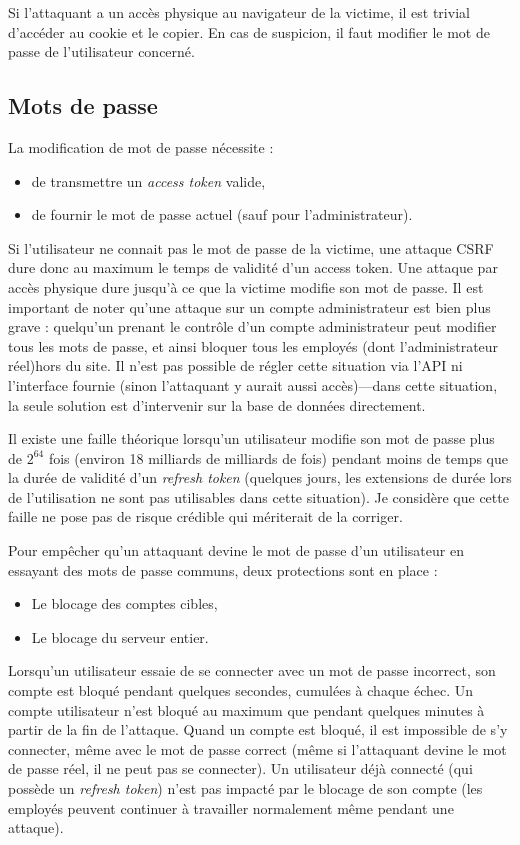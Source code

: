 \documentclass[11pt,french]{memoir}
\begin{document}
	Si l’attaquant a un accès physique au navigateur de la victime, il est trivial d’accéder au cookie et le copier.
	En cas de suspicion, il faut modifier le mot de passe de l’utilisateur concerné.

	\subsection{Mots de passe}\label{subsec:mots-de-passe}

	La modification de mot de passe nécessite :
	\begin{itemize}
		\item de transmettre un \emph{access token} valide,
		\item de fournir le mot de passe actuel (sauf pour l'administrateur).
	\end{itemize}

	Si l’utilisateur ne connait pas le mot de passe de la victime, une attaque CSRF dure donc au maximum le temps de validité d’un access token.
	Une attaque par accès physique dure jusqu’à ce que la victime modifie son mot de passe.
	Il est important de noter qu’une attaque sur un compte administrateur est bien plus grave :
	quelqu’un prenant le contrôle d’un compte administrateur peut modifier tous les mots de passe, et ainsi bloquer tous les employés (dont l’administrateur réel)hors du site.
	Il n’est pas possible de régler cette situation via l’API ni l’interface fournie (sinon l’attaquant y aurait aussi accès)---dans cette situation, la seule solution est d'intervenir sur la base de données directement.

	Il existe une faille théorique lorsqu’un utilisateur modifie son mot de passe plus de $2^{64}$ fois (environ 18 milliards de milliards de fois) pendant moins de temps que la durée de validité d’un \emph{refresh token} (quelques jours, les extensions de durée lors de l’utilisation ne sont pas utilisables dans cette situation).
	Je considère que cette faille ne pose pas de risque crédible qui mériterait de la corriger.

	\uparagraph
	Pour empêcher qu’un attaquant devine le mot de passe d’un utilisateur en essayant des mots de passe communs, deux protections sont en place :
	\begin{itemize}
		\item Le blocage des comptes cibles,
		\item Le blocage du serveur entier.
	\end{itemize}

	Lorsqu’un utilisateur essaie de se connecter avec un mot de passe incorrect, son compte est bloqué pendant quelques secondes, cumulées à chaque échec.
	Un compte utilisateur n’est bloqué au maximum que pendant quelques minutes à partir de la fin de l’attaque.
	Quand un compte est bloqué, il est impossible de s’y connecter, même avec le mot de passe correct (même si l’attaquant devine le mot de passe réel, il ne peut pas se connecter).
	Un utilisateur déjà connecté (qui possède un \emph{refresh token}) n’est pas impacté par le blocage de son compte (les employés peuvent continuer à travailler normalement même pendant une attaque).
\end{document}
